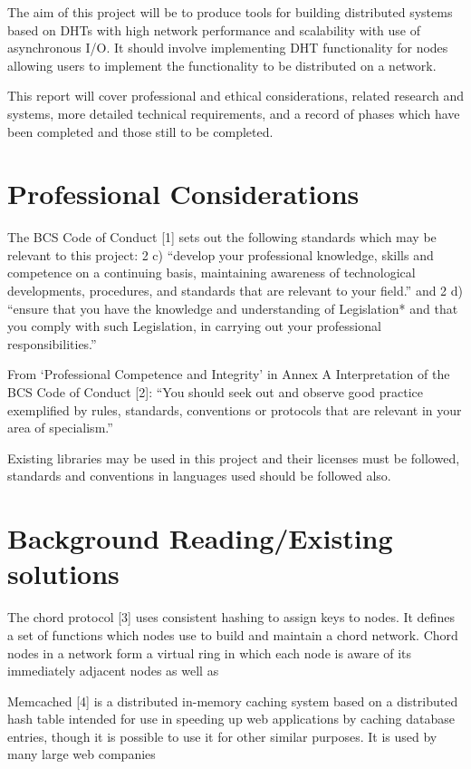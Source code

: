 \documentclass{article}
\begin{document}
The aim of this project will be to produce tools for building distributed systems based on DHTs with high network performance and scalability with use of asynchronous I/O. It should involve implementing DHT functionality for nodes allowing users to implement the functionality to be distributed on a network.

This report will cover professional and ethical considerations, related research and systems, more detailed technical requirements, and a record of phases which have been completed and those still to be completed.

\section{Professional Considerations}
The BCS Code of Conduct [1] sets out the following standards which may be relevant to this project: 2 c) “develop your professional knowledge, skills and competence on a continuing basis, maintaining awareness of technological developments, procedures, and standards that are relevant to your field.” and 2 d) “ensure that you have the knowledge and understanding of Legislation* and that you comply with such Legislation, in carrying out your professional responsibilities.”

From ‘Professional Competence and Integrity’ in Annex A Interpretation of the BCS Code of Conduct [2]: “You should seek out and observe good practice exemplified by rules, standards, conventions or protocols that are relevant in your area of specialism.”

Existing libraries may be used in this project and their licenses must be followed, standards and conventions in languages used should be followed also.



\section{Background Reading/Existing solutions}
The chord protocol [3] uses consistent hashing to assign keys to nodes. It defines a set of functions which nodes use to build and maintain a chord network. Chord nodes in a network form a virtual ring in which each node is aware of its immediately adjacent nodes as well as 

Memcached [4] is a distributed in-memory caching system based on a distributed hash table intended for use in speeding up web applications by caching database entries, though it is possible to use it for other similar purposes. It is used by many large web companies
\end{document}
